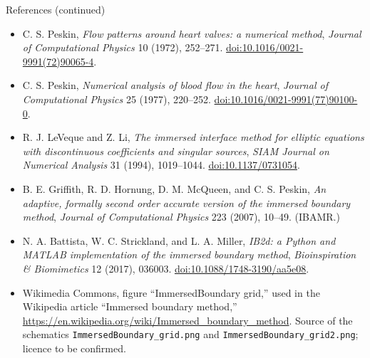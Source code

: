 \documentclass[aspectratio=169,11pt]{beamer}
\begin{document}
\begin{frame}{References (continued)}
\footnotesize
\begin{itemize}\itemsep5pt
  \item C. S. Peskin, \emph{Flow patterns around heart valves: a numerical method}, \emph{Journal of Computational Physics} 10 (1972), 252--271. \href{https://doi.org/10.1016/0021-9991(72)90065-4}{doi:10.1016/0021-9991(72)90065-4}.
  \item C. S. Peskin, \emph{Numerical analysis of blood flow in the heart}, \emph{Journal of Computational Physics} 25 (1977), 220--252. \href{https://doi.org/10.1016/0021-9991(77)90100-0}{doi:10.1016/0021-9991(77)90100-0}.
  \item R. J. LeVeque and Z. Li, \emph{The immersed interface method for elliptic equations with discontinuous coefficients and singular sources}, \emph{SIAM Journal on Numerical Analysis} 31 (1994), 1019--1044. \href{https://doi.org/10.1137/0731054}{doi:10.1137/0731054}.
  \item B. E. Griffith, R. D. Hornung, D. M. McQueen, and C. S. Peskin, \emph{An adaptive, formally second order accurate version of the immersed boundary method}, \emph{Journal of Computational Physics} 223 (2007), 10--49. (IBAMR.)
  \item N. A. Battista, W. C. Strickland, and L. A. Miller, \emph{IB2d: a Python and MATLAB implementation of the immersed boundary method}, \emph{Bioinspiration \& Biomimetics} 12 (2017), 036003. \href{https://doi.org/10.1088/1748-3190/aa5e08}{doi:10.1088/1748-3190/aa5e08}.
  \item Wikimedia Commons, figure ``ImmersedBoundary grid,'' used in the Wikipedia article ``Immersed boundary method,'' \url{https://en.wikipedia.org/wiki/Immersed_boundary_method}. Source of the schematics \texttt{ImmersedBoundary\_grid.png} and \texttt{ImmersedBoundary\_grid2.png}; licence to be confirmed.
\end{itemize}
\end{frame}
\end{document}
